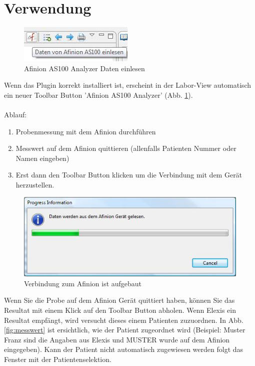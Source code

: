 \documentclass[a4paper]{scrartcl}
\begin{document}
\section{Verwendung}
\begin{figure}[h]
    \includegraphics{toolbarbutton}
    \caption{Afinion AS100 Analyzer Daten einlesen}
    \label{fig:toolbarbutton}
\end{figure}
Wenn das Plugin korrekt installiert ist, erscheint in der Labor-View automatisch ein neuer Toolbar Button 'Afinion AS100 Analyzer' (Abb. \ref{fig:toolbarbutton}).\\
\\
Ablauf:
\begin{enumerate}
\item Probenmessung mit dem Afinion durchf\"uhren
\item Messwert auf dem Afinion quittieren (allenfalls Patienten Nummer oder Namen eingeben)
\item Erst dann den Toolbar Button klicken um die Verbindung mit dem Ger\"at herzustellen.
\end{enumerate}
\begin{figure}[h]
    \includegraphics{connected}
    \caption{Verbindung zum Afinion ist aufgebaut}
    \label{fig:connected}
\end{figure}
Wenn Sie die Probe auf dem Afinion Ger\"at quittiert haben, k\"onnen Sie das Resultat mit einem Klick auf den Toolbar Button abholen. Wenn Elexis ein Resultat empf\"angt, wird versucht dieses einem Patienten zuzuordnen. In Abb. \ref{fig:messwert} ist ersichtlich, wie der Patient zugeordnet wird (Beispiel: Muster Franz sind die Angaben aus Elexis und MUSTER wurde auf dem Afinion eingegeben). Kann der Patient nicht automatisch zugewiesen werden folgt das Fenster mit der Patientenselektion.\\
\end{document}
